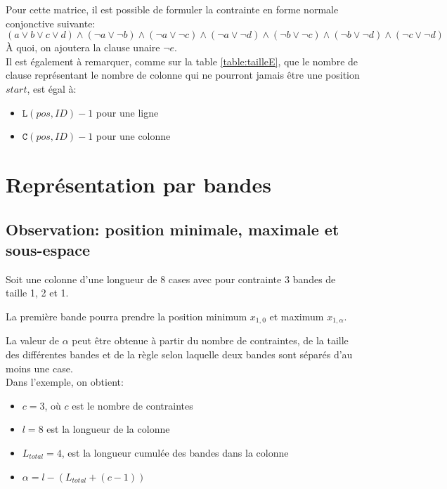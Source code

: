 \documentclass[a4paper,12pt]{report}
\begin{document}
Pour cette matrice, il est possible de formuler la contrainte en forme normale conjonctive suivante:
$$ (a \vee b \vee c \vee d ) \wedge (\lnot a \vee \lnot b) \wedge (\lnot a \vee \lnot c) \wedge (\lnot a \vee \lnot d)\wedge (\lnot b \vee \lnot c) \wedge (\lnot b \vee \lnot d)\wedge (\lnot c \vee \lnot d)$$   
À quoi, on ajoutera la clause unaire $\lnot e$.\\

Il est également à remarquer, comme sur la table \ref{table:tailleE}, que le nombre de clause représentant le nombre de colonne qui ne pourront jamais être une position $start$, est égal à:
\begin{itemize}
\item[]$\mathtt{L}(pos,ID) - 1$ pour une ligne 
\item[]$\mathtt{C}(pos,ID)-1$ pour une colonne
\end{itemize}  
	

\section{Représentation par bandes}
\subsection{Observation: position minimale, maximale et sous-espace}

Soit une colonne d'une longueur de 8 cases avec pour contrainte 3 bandes de taille 1, 2 et 1.

La première bande pourra prendre la position minimum $x_{1,0}$ et maximum $x_{1,\alpha}$.

La valeur de $\alpha$ peut être obtenue à partir du nombre de contraintes, de la taille des différentes bandes et de la règle selon laquelle deux bandes sont séparés d'au moins une case.\\

Dans l'exemple, on obtient:
\begin{itemize}
\item[] $c = 3$, où $c$ est le nombre de contraintes
\item[] $l = 8$ est la longueur de la colonne
\item[] $L_{total} = 4$, est la longueur cumulée des bandes dans la colonne
\item[] $\alpha = l-(L_{total}+(c-1))$
\end{itemize}
\end{document}
